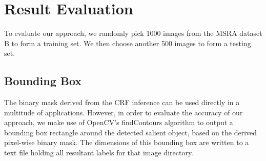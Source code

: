 \documentclass[10pt,twocolumn,letterpaper]{article}
\begin{document}
\section{Result Evaluation}
To evaluate our approach, we randomly pick 1000 images from the MSRA dataset B to form a training set.
We then choose another 500 images to form a testing set.

\subsection{Bounding Box}
The binary mask derived from the CRF inference can be used directly in a multitude of applications. However, in order to evaluate the accuracy of our approach, we make use of OpenCV's findContours algorithm \cite{topological} to output a bounding box rectangle around the detected salient object, based on the derived pixel-wise binary mask. The dimensions of this bounding box are written to a text file holding all resultant labels for that image directory.
\end{document}
